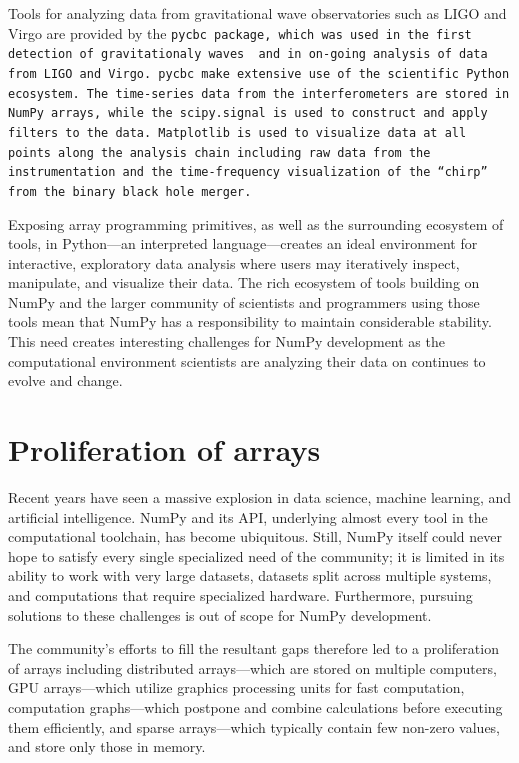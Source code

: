 Tools for analyzing data from gravitational wave observatories such as LIGO
and Virgo are provided by the \tt{pycbc} package, which was used in the first
detection of gravitationaly waves \cite{abbott2016observation} and in 
on-going analysis of data from LIGO and Virgo.
\tt{pycbc} make extensive use of the scientific Python ecosystem.
The time-series data from the interferometers are stored in NumPy arrays,
while the \tt{scipy.signal} is used to construct and apply filters to the
data.
Matplotlib is used to visualize data at all points along the analysis chain
including raw data from the instrumentation and the time-frequency 
visualization of the ``chirp'' from the binary black hole merger.

Exposing array programming primitives, as well as the surrounding ecosystem of
tools, in Python---an interpreted language---creates an ideal environment for
interactive, exploratory data analysis where users may iteratively inspect,
manipulate, and visualize their data.
The rich ecosystem of tools building on NumPy and the larger community
of scientists and programmers using those tools mean that NumPy has a
responsibility to maintain considerable stability.
This need creates interesting challenges for NumPy development as the
computational environment scientists are analyzing their data on continues
to evolve and change.

\section*{Proliferation of arrays}


Recent years have seen a massive explosion in data science, machine learning,
and artificial intelligence.  NumPy and its API, underlying almost every tool
in the computational toolchain, has become ubiquitous.  Still, NumPy itself
could never hope to satisfy every single specialized need of the community; it
is limited in its ability to work with very large datasets, datasets split
across multiple systems, and computations that require specialized hardware.
Furthermore, pursuing solutions to these challenges is out of scope for NumPy
development.

The community's efforts to fill the resultant gaps therefore led to a
proliferation of arrays including distributed arrays---which are stored on
multiple computers, GPU arrays---which utilize graphics processing units for
fast computation, computation graphs---which postpone and combine calculations
before executing them efficiently, and sparse arrays---which typically contain
few non-zero values, and store only those in memory.

